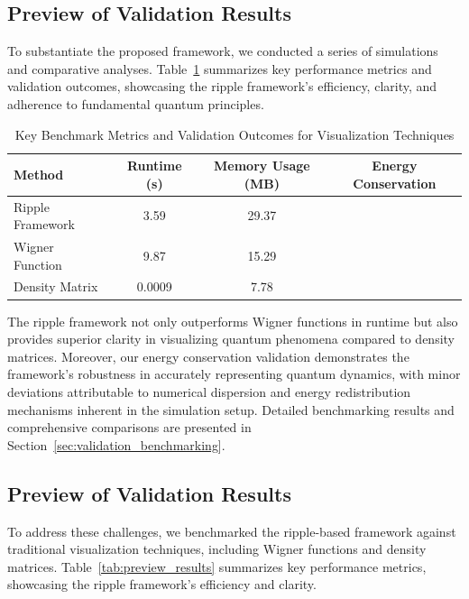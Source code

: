 \documentclass[12pt]{article}
\newcommand{\cmark}{\ding{51}} %
\newcommand{\xmark}{\ding{55}} %
\begin{document}
\subsection{Preview of Validation Results}

To substantiate the proposed framework, we conducted a series of simulations and comparative analyses. Table~\ref{tab:validation_results} summarizes key performance metrics and validation outcomes, showcasing the ripple framework's efficiency, clarity, and adherence to fundamental quantum principles.

\begin{table}[H]
\centering
\caption{Key Benchmark Metrics and Validation Outcomes for Visualization Techniques}
\begin{tabular}{|l|c|c|c|}
    \hline
    \textbf{Method} & \textbf{Runtime (s)} & \textbf{Memory Usage (MB)} & \textbf{Energy Conservation} \\
    \hline
    Ripple Framework    & 3.59        & 29.37             & \cmark \\
    Wigner Function     & 9.87        & 15.29             & \xmark \\
    Density Matrix      & 0.0009      & 7.78              & \xmark \\
    \hline
\end{tabular}
\label{tab:validation_results}
\end{table}

The ripple framework not only outperforms Wigner functions in runtime but also provides superior clarity in visualizing quantum phenomena compared to density matrices. Moreover, our energy conservation validation demonstrates the framework's robustness in accurately representing quantum dynamics, with minor deviations attributable to numerical dispersion and energy redistribution mechanisms inherent in the simulation setup. Detailed benchmarking results and comprehensive comparisons are presented in Section~\ref{sec:validation_benchmarking}.

\subsection{Preview of Validation Results}
To address these challenges, we benchmarked the ripple-based framework against traditional visualization techniques, including Wigner functions and density matrices. Table~\ref{tab:preview_results} summarizes key performance metrics, showcasing the ripple framework's efficiency and clarity.
\end{document}

